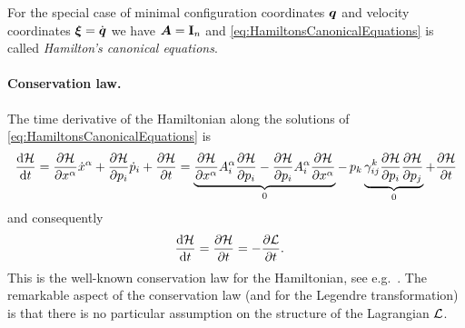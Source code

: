 For the special case of minimal configuration coordinates $\genCoord$ and velocity coordinates $\sysVel = \genCoordd$ we have $\kinMat = \idMat[\dimConfigSpace]$ and \eqref{eq:HamiltonsCanonicalEquations} is called \textit{Hamilton's canonical equations}.

\paragraph{Conservation law.}
The time derivative of the Hamiltonian along the solutions of \eqref{eq:HamiltonsCanonicalEquations} is
\begin{align}\label{eq:BalanceHamiltonian}
 \diff[\Hamiltonian]{t} = \pdiff[\Hamiltonian]{\sysCoordCoeff{\GidxI}} \sysCoordCoeffd{\GidxI} + \pdiff[\Hamiltonian]{\genMomentumCoeff{\LidxI}} \genMomentumCoeffd{\LidxI} + \pdiff[\Hamiltonian]{t}
 = \underbrace{\pdiff[\Hamiltonian]{\sysCoordCoeff{\GidxI}} \kinMatCoeff{\GidxI}{\LidxI} \pdiff[\Hamiltonian]{\genMomentumCoeff{\LidxI}}
 - \pdiff[\Hamiltonian]{\genMomentumCoeff{\LidxI}} \kinMatCoeff{\GidxI}{\LidxI} \pdiff[\Hamiltonian]{\sysCoordCoeff{\GidxI}}}_{0}
 - \,\genMomentumCoeff{\LidxIII} \underbrace{\BoltzSym{\LidxIII}{\LidxI}{\LidxII} \pdiff[\Hamiltonian]{\genMomentumCoeff{\LidxI}} \pdiff[\Hamiltonian]{\genMomentumCoeff{\LidxII}}}_{0}
 + \pdiff[\Hamiltonian]{t}
\end{align}
and consequently
\begin{align}
 \diff[\Hamiltonian]{t} &= \pdiff[\Hamiltonian]{t} = -\pdiff[\Lagrangian]{t}.
\end{align}
This is the well-known conservation law for the Hamiltonian, see e.g.\ \cite[ch.\,VI.6]{Lanczos:Variational}.
The remarkable aspect of the conservation law (and for the Legendre transformation) is that there is no particular assumption on the structure of the Lagrangian $\Lagrangian$.



